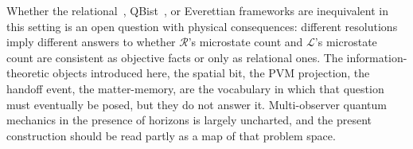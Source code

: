 Whether the relational~\cite{rovelli1996relational}, 
QBist~\cite{fuchs2014introducing}, or Everettian 
frameworks are inequivalent in this setting is an 
open question with physical consequences:
different resolutions imply different answers to whether 
$\mathcal{R}$'s microstate count and $\mathcal{L}$'s 
microstate count are consistent as objective facts 
or only as relational ones. The information-theoretic 
objects introduced here, the spatial bit, the PVM 
projection, the handoff event, the matter-memory, are 
the vocabulary in which that question must eventually 
be posed, but they do not answer it. Multi-observer 
quantum mechanics in the presence of horizons is 
largely uncharted, and the present construction 
should be read partly as a map of that problem space.
